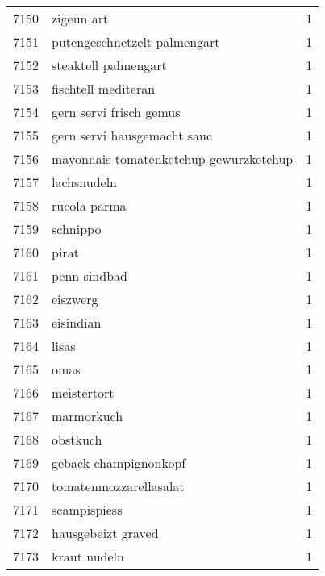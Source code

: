 \begin{tabular}{llr}
7150 &                                         zigeun art &      1 \\
7151 &                       putengeschnetzelt palmengart &      1 \\
7152 &                               steaktell palmengart &      1 \\
7153 &                                fischtell mediteran &      1 \\
7154 &                            gern servi frisch gemus &      1 \\
7155 &                        gern servi hausgemacht sauc &      1 \\
7156 &             mayonnais tomatenketchup gewurzketchup &      1 \\
7157 &                                        lachsnudeln &      1 \\
7158 &                                       rucola parma &      1 \\
7159 &                                           schnippo &      1 \\
7160 &                                              pirat &      1 \\
7161 &                                       penn sindbad &      1 \\
7162 &                                           eiszwerg &      1 \\
7163 &                                          eisindian &      1 \\
7164 &                                              lisas &      1 \\
7165 &                                               omas &      1 \\
7166 &                                        meistertort &      1 \\
7167 &                                         marmorkuch &      1 \\
7168 &                                           obstkuch &      1 \\
7169 &                              geback champignonkopf &      1 \\
7170 &                             tomatenmozzarellasalat &      1 \\
7171 &                                       scampispiess &      1 \\
7172 &                                 hausgebeizt graved &      1 \\
7173 &                                       kraut nudeln &      1 \\

\end{tabular}
